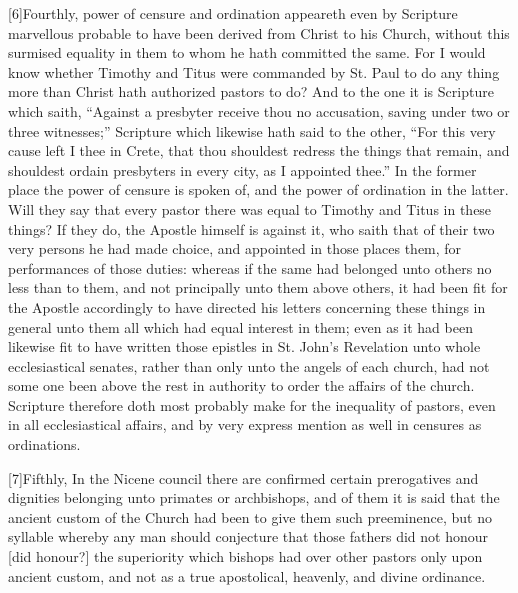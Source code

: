 [6]Fourthly, power of censure and ordination appeareth even by Scripture marvellous probable to have been derived from Christ to his Church, without this surmised equality in them to whom he hath committed the same. For I would know whether Timothy and Titus were commanded by St. Paul to do any thing more than Christ hath authorized pastors to do? And to the one it is Scripture which saith, “Against a presbyter receive thou no accusation, saving under two or three witnesses;” Scripture which likewise hath said to the other, “For this very cause left I thee in Crete, that thou shouldest redress the things that remain, and shouldest ordain presbyters in every city, as I appointed thee.” In the former place the power of censure is spoken of, and the power of ordination in the latter. Will they say that every pastor there was equal to Timothy and Titus in these things? If they do, the Apostle himself is against it, who saith that of their two very persons he had made choice, and appointed in those places them, for performances of those duties: whereas if the same had belonged unto others no less than to them, and not principally unto them above others, it had been fit for the Apostle accordingly to have directed his letters concerning these things in general unto them all which had equal interest in them; even as it had been likewise fit to have written those epistles in St. John’s Revelation unto whole ecclesiastical senates, rather than only unto the angels of each church, had not some one been above the rest in authority to order the affairs of the church. Scripture therefore doth most probably make for the  inequality of pastors, even in all ecclesiastical affairs,
 and by very express mention as well in censures as ordinations.

[7]Fifthly, In the Nicene council there are confirmed certain prerogatives and dignities belonging unto primates or archbishops, and of them it is said that the ancient custom of the Church had been to give them such preeminence, but no syllable whereby any man should conjecture that those fathers did not honour [did honour?] the superiority which bishops had over other pastors only upon ancient custom, and not as a true apostolical, heavenly, and divine ordinance.


